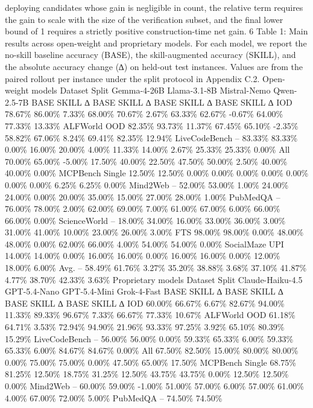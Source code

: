 deploying candidates whose gain is negligible in count, the relative term requires the gain to scale with the size of the
verification subset, and the final lower bound of 1 requires a strictly positive construction-time net gain.
6
Table 1: Main results across open-weight and proprietary models. For each model, we report the
no-skill baseline accuracy (BASE), the skill-augmented accuracy (SKILL), and the absolute accuracy
change (∆) on held-out test instances. Values are from the paired rollout per instance under the split
protocol in Appendix C.2.
Open-weight models
Dataset
Split
Gemma-4-26B
Llama-3.1-8B
Mistral-Nemo
Qwen-2.5-7B
BASE
SKILL
∆
BASE
SKILL
∆
BASE
SKILL
∆
BASE
SKILL
∆
IOD
78.67\% 86.00\%
7.33\%
68.00\% 70.67\%
2.67\%
63.33\% 62.67\% -0.67\% 64.00\%
77.33\%
13.33\%
ALFWorld
OOD
82.35\% 93.73\% 11.37\% 67.45\% 65.10\%
-2.35\%
58.82\% 67.06\%
8.24\%
69.41\%
82.35\%
12.94\%
LiveCodeBench –
83.33\% 83.33\%
0.00\%
16.00\% 20.00\%
4.00\%
11.33\% 14.00\%
2.67\%
25.33\%
25.33\%
0.00\%
All
70.00\% 65.00\% -5.00\% 17.50\% 40.00\% 22.50\% 47.50\% 50.00\%
2.50\%
40.00\%
40.00\%
0.00\%
MCPBench
Single 12.50\% 12.50\%
0.00\%
0.00\%
0.00\%
0.00\%
0.00\%
0.00\%
0.00\%
6.25\%
6.25\%
0.00\%
Mind2Web
–
52.00\% 53.00\%
1.00\%
24.00\% 24.00\%
0.00\%
20.00\% 35.00\% 15.00\% 27.00\%
28.00\%
1.00\%
PubMedQA
–
76.00\% 78.00\%
2.00\%
62.00\% 69.00\%
7.00\%
61.00\% 67.00\%
6.00\%
66.00\%
66.00\%
0.00\%
ScienceWorld
–
18.00\% 34.00\% 16.00\% 33.00\% 36.00\%
3.00\%
31.00\% 41.00\% 10.00\% 23.00\%
26.00\%
3.00\%
FTS
98.00\% 98.00\%
0.00\%
48.00\% 48.00\%
0.00\%
62.00\% 66.00\%
4.00\%
54.00\%
54.00\%
0.00\%
SocialMaze
UPI
14.00\% 14.00\%
0.00\%
16.00\% 16.00\%
0.00\%
16.00\% 16.00\%
0.00\%
12.00\%
18.00\%
6.00\%
Avg.
–
58.49\% 61.76\% 3.27\% 35.20\% 38.88\%
3.68\%
37.10\% 41.87\% 4.77\% 38.70\% 42.33\%
3.63\%
Proprietary models
Dataset
Split
Claude-Haiku-4.5
GPT-5.4-Nano
GPT-5.4-Mini
Grok-4-Fast
BASE
SKILL
∆
BASE
SKILL
∆
BASE
SKILL
∆
BASE
SKILL
∆
IOD
60.00\% 66.67\%
6.67\%
82.67\% 94.00\% 11.33\% 89.33\% 96.67\%
7.33\%
66.67\%
77.33\%
10.67\%
ALFWorld
OOD
61.18\% 64.71\%
3.53\%
72.94\% 94.90\% 21.96\% 93.33\% 97.25\%
3.92\%
65.10\%
80.39\%
15.29\%
LiveCodeBench –
56.00\% 56.00\%
0.00\%
59.33\% 65.33\%
6.00\%
59.33\% 65.33\%
6.00\%
84.67\%
84.67\%
0.00\%
All
67.50\% 82.50\% 15.00\% 80.00\% 80.00\%
0.00\%
75.00\% 75.00\%
0.00\%
47.50\%
65.00\%
17.50\%
MCPBench
Single 68.75\% 81.25\% 12.50\% 18.75\% 31.25\% 12.50\% 43.75\% 43.75\%
0.00\%
12.50\%
12.50\%
0.00\%
Mind2Web
–
60.00\% 59.00\% -1.00\% 51.00\% 57.00\%
6.00\%
57.00\% 61.00\%
4.00\%
67.00\%
72.00\%
5.00\%
PubMedQA
–
74.50\% 74.50\%
